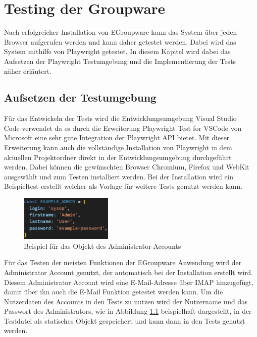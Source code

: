 
\chapter{Testing der Groupware}

Nach erfolgreicher Installation von EGroupware kann das System über jeden Browser aufgerufen werden und kann daher getestet werden.
Dabei wird das System mithilfe von Playwright getestet.
In diesem Kapitel wird dabei das Aufsetzen der Playwright Testumgebung und die Implementierung der Tests näher erläutert.

\section{Aufsetzen der Testumgebung}

Für das Entwickeln der Tests wird die Entwicklungsumgebung Visual Studio Code verwendet da es durch die Erweiterung \glqq Playwright Test for VSCode \grqq von Microsoft eine sehr gute Integration der Playwright API bietet.
Mit dieser Erweiterung kann auch die vollständige Installation von Playwright in dem aktuellen Projektordner direkt in der Entwicklungsumgebung durchgeführt werden.
Dabei können die gewünschten Browser Chromium, Firefox und WebKit ausgewählt und zum Testen installiert werden.
Bei der Installation wird ein Beispieltest erstellt welcher als Vorlage für weitere Tests genutzt werden kann.

\begin{figure}[H]
    \centering
    \includegraphics[width=0.4\textwidth]{images/ExampleAdmin.png}
    \caption{Beispiel für das Objekt des Administrator-Accounts}
    \label{fig:example-admin}
\end{figure}

Für das Testen der meisten Funktionen der EGroupware Anwendung wird der Administrator Account genutzt, der automatisch bei der Installation erstellt wird.
Diesem Administrator Account wird eine E-Mail-Adresse über IMAP hinzugefügt, damit über ihn auch die E-Mail Funktion getestet werden kann.
Um die Nutzerdaten des Accounts in den Tests zu nutzen wird der Nutzername und das Passwort des Administrators, wie in Abbildung \ref{fig:example-admin} beispielhaft dargestellt, in der Testdatei als statisches Objekt gespeichert und kann dann in den Tests genutzt werden.

